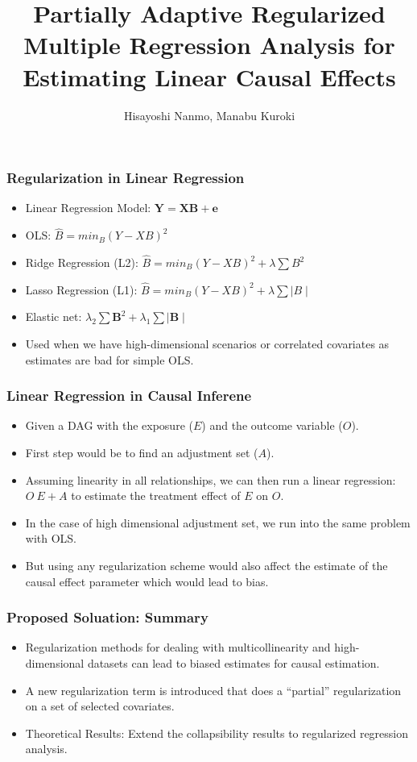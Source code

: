 \documentclass{beamer}
\title{Partially Adaptive Regularized Multiple Regression Analysis for Estimating Linear Causal Effects}
\author{Hisayoshi Nanmo, Manabu Kuroki}
\date{}
\begin{document}
\maketitle

\begin{frame}
	\frametitle{Regularization in Linear Regression}
	\begin{itemize}
		\item Linear Regression Model: $ \bm{Y} = \bm{XB} + \bm{e} $
		\item OLS: $ \hat{B} = min_{B} (Y - XB)^2 $
		\item Ridge Regression (L2): $ \hat{B} = min_{B} (Y-XB)^2 +
			\lambda \sum B^2 $
		\item Lasso Regression (L1): $ \hat{B} = min_{B} (Y-XB)^2 +
			\lambda \sum \mid B \mid $
		\item Elastic net: $ \lambda_2 \sum \bm{B}^2 + \lambda_1 \sum
			\mid \bm{B} \mid $
		\item Used when we have high-dimensional scenarios or
			correlated covariates as estimates are bad for simple
			OLS.
	\end{itemize}
\end{frame}

\begin{frame}
	\frametitle{Linear Regression in Causal Inferene}
	\begin{itemize}
		\item Given a DAG with the exposure ($ E $) and the outcome
			variable ($ O $).
		\item First step would be to find an adjustment set ($ A $).
		\item Assuming linearity in all relationships, we can then run
			a linear regression: $ O ~ E + A $ to estimate the
			treatment effect of $ E $ on $ O $.
		\item In the case of high dimensional adjustment set, we run
			into the same problem with OLS.
		\item But using any regularization scheme would also affect the
			estimate of the causal effect parameter which would
			lead to bias.
	\end{itemize}
\end{frame}

\begin{frame}
	\frametitle{Proposed Soluation: Summary}
	\begin{itemize}
		\item Regularization methods for dealing with multicollinearity
			and high-dimensional datasets can lead to biased
			estimates for causal estimation.
		\item A new regularization term is introduced that does a
			``partial'' regularization on a set of selected
			covariates.
		\item Theoretical Results: Extend the collapsibility results to regularized
			regression analysis.
	\end{itemize}
\end{frame}
\end{document}
